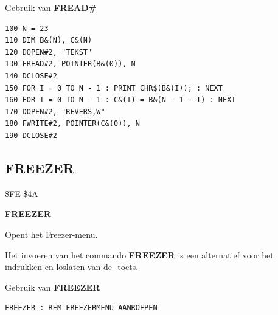 \begin{description}[leftmargin=2cm,style=nextline]
\item [Voorbeeld:]  Gebruik van {\bf FREAD\#}

\begin{tcolorbox}[colback=black,coltext=white]
\verbatimfont{\codefont}
\begin{verbatim}
100 N = 23
110 DIM B&(N), C&(N)
120 DOPEN#2, "TEKST"
130 FREAD#2, POINTER(B&(0)), N
140 DCLOSE#2
150 FOR I = 0 TO N - 1 : PRINT CHR$(B&(I)); : NEXT
160 FOR I = 0 TO N - 1 : C&(I) = B&(N - 1 - I) : NEXT
170 DOPEN#2, "REVERS,W"
180 FWRITE#2, POINTER(C&(0)), N
190 DCLOSE#2
\end{verbatim}
\end{tcolorbox}
\end{description}


\newpage
\subsection{FREEZER}
\begin{description}[leftmargin=2cm,style=nextline]
\item [Token:]    \$FE \$4A

\item [Formaat:]   {\bf FREEZER}

\item [Gebruik:]    Opent het Freezer-menu.

\item [Opmerkingen:]  Het invoeren van het commando {\bf FREEZER} is een alternatief voor het indrukken en loslaten van de -toets.

\item [Voorbeeld:]  Gebruik van {\bf FREEZER}

\begin{tcolorbox}[colback=black,coltext=white]
\verbatimfont{\codefont}
\begin{verbatim}
FREEZER : REM FREEZERMENU AANROEPEN
\end{verbatim}
\end{tcolorbox}
\end{description}


\newpage
